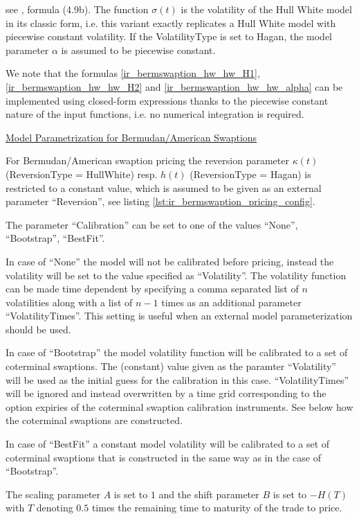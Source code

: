 see \cite{Hagan_LGM}, formula (4.9b). The function $\sigma(t)$ is the volatility of the Hull White model in its classic
form, i.e. this variant exactly replicates a Hull White model with piecewise constant volatility. If the VolatilityType
is set to Hagan, the model parameter $\alpha$ is assumed to be piecewise constant.

We note that the formulas \ref{ir_bermswaption_hw_hw_H1}, \ref{ir_bermswaption_hw_hw_H2} and
\ref{ir_bermswaption_hw_hw_alpha} can be implemented using closed-form expressions thanks to the piecewise constant
nature of the input functions, i.e. no numerical integration is required.



\underline{Model Parametrization for Bermudan/American Swaptions}

For Bermudan/American swaption pricing the reversion parameter $\kappa(t)$ (ReversionType = HullWhite) resp. $h(t)$
(ReversionType = Hagan) is restricted to a constant value, which is assumed to be given as an external parameter
``Reversion'', see listing \ref{lst:ir_bermswaption_pricing_config}.

The parameter ``Calibration'' can be set to one of the values ``None'', ``Bootstrap'', ``BestFit''.

In case of ``None'' the model will not be calibrated before pricing, instead the volatility will be set to the value
specified as ``Volatility''. The volatility function can be made time dependent by specifying a comma separated list of
$n$ volatilities along with a list of $n-1$ times as an additional parameter ``VolatilityTimes''. This setting is useful
when an external model parameterization should be used.

In case of ``Bootstrap'' the model volatility function will be calibrated to a set of coterminal swaptions. The
(constant) value given as the paramter ``Volatility'' will be used as the initial guess for the calibration in this
case. ``VolatilityTimes'' will be ignored and instead overwritten by a time grid corresponding to the option expiries of
the coterminal swaption calibration instruments. See below how the coterminal swaptions are constructed.

In case of ``BestFit'' a constant model volatility will be calibrated to a set of coterminal swaptions that is
constructed in the same way as in the case of ``Bootstrap''.

The scaling parameter $A$ is set to $1$ and the shift parameter $B$ is set to $-H(T)$ with $T$ denoting $0.5$ times the
remaining time to maturity of the trade to price.



